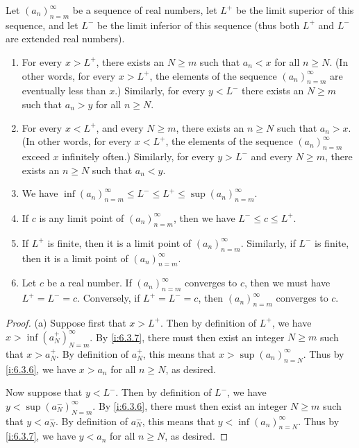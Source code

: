 \begin{prop}\label{i:6.4.12}
  Let \((a_n)_{n = m}^\infty\) be a sequence of real numbers, let \(L^+\) be the limit superior of this sequence, and let \(L^-\) be the limit inferior of this sequence
  (thus both \(L^+\) and \(L^-\) are extended real numbers).
  \begin{enumerate}
    \item For every \(x > L^+\), there exists an \(N \geq m\) such that \(a_n < x\) for all \(n \geq N\).
          (In other words, for every \(x > L^+\), the elements of the sequence \((a_n)_{n = m}^\infty\) are eventually less than \(x\).)
          Similarly, for every \(y < L^-\) there exists an \(N \geq m\) such that \(a_n > y\) for all \(n \geq N\).
    \item For every \(x < L^+\), and every \(N \geq m\), there exists an \(n \geq N\) such that \(a_n > x\).
          (In other words, for every \(x < L^+\), the elements of the sequence \((a_n)_{n = m}^\infty\) exceed \(x\) infinitely often.)
          Similarly, for every \(y > L^-\) and every \(N \geq m\), there exists an \(n \geq N\) such that \(a_n < y\).
    \item We have \(\inf(a_n)_{n = m}^\infty \leq L^- \leq L^+ \leq \sup(a_n)_{n = m}^\infty\).
    \item If \(c\) is any limit point of \((a_n)_{n = m}^\infty\), then we have \(L^- \leq c \leq L^+\).
    \item If \(L^+\) is finite, then it is a limit point of \((a_n)_{n = m}^\infty\).
          Similarly, if \(L^-\) is finite, then it is a limit point of \((a_n)_{n = m}^\infty\).
    \item Let \(c\) be a real number.
          If \((a_n)_{n = m}^\infty\) converges to \(c\), then we must have \(L^+ = L^- = c\).
          Conversely, if \(L^+ = L^- = c\), then \((a_n)_{n = m}^\infty\) converges to \(c\).
  \end{enumerate}
\end{prop}

\begin{proof}{(a)}
  Suppose first that \(x > L^+\).
  Then by definition of \(L^+\), we have \(x > \inf(a_N^+)_{N = m}^\infty\).
  By \cref{i:6.3.7}, there must then exist an integer \(N \geq m\) such that \(x > a_N^+\).
  By definition of \(a_N^+\), this means that \(x > \sup(a_n)_{n = N}^\infty\).
  Thus by \cref{i:6.3.6}, we have \(x > a_n\) for all \(n \geq N\), as desired.

  Now suppose that \(y < L^-\).
  Then by definition of \(L^-\), we have \(y < \sup(a_N^-)_{N = m}^\infty\).
  By \cref{i:6.3.6}, there must then exist an integer \(N \geq m\) such that \(y < a_N^-\).
  By definition of \(a_N^-\), this means that \(y < \inf(a_n)_{n = N}^\infty\).
  Thus by \cref{i:6.3.7}, we have \(y < a_n\) for all \(n \geq N\), as desired.
\end{proof}

